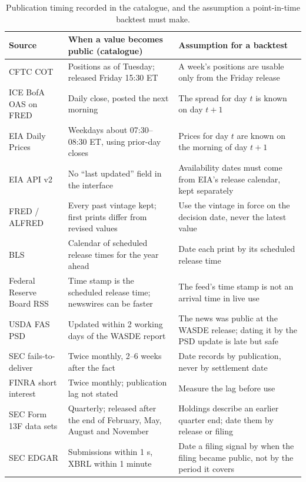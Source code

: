 \documentclass[10pt, a4paper, twocolumn]{article}
\renewcommand{\toprule}{\arrayrulecolor{qnavy}\specialrule{\heavyrulewidth}{\abovetopsep}{\belowrulesep}\arrayrulecolor{black}}
\newcommand{\qstripes}{\rowcolors{2}{qstripe}{white}}
\newcommand{\qhead}[1]{\textbf{\color{qnavy}#1}}
\begin{document}
\begin{table}[!t]
\centering
\caption{Publication timing recorded in the catalogue, and the assumption a point-in-time backtest must make.}
\label{tab:timing}
\footnotesize
\setlength{\tabcolsep}{4pt}
\qstripes
\begin{tabularx}{\textwidth}{@{}L{3.4cm}L{6.4cm}Y@{}}
\toprule
\qhead{Source} & \qhead{When a value becomes public (catalogue)} & \qhead{Assumption for a backtest} \\
\midrule
CFTC COT & Positions as of Tuesday; released Friday 15:30 ET & A week's positions are usable only from the Friday release \\
ICE BofA OAS on FRED & Daily close, posted the next morning & The spread for day $t$ is known on day $t+1$ \\
EIA Daily Prices & Weekdays about 07:30--08:30 ET, using prior-day closes & Prices for day $t$ are known on the morning of day $t+1$ \\
EIA API v2 & No ``last updated'' field in the interface & Availability dates must come from EIA's release calendar, kept separately \\
FRED / ALFRED & Every past vintage kept; first prints differ from revised values & Use the vintage in force on the decision date, never the latest value \\
BLS & Calendar of scheduled release times for the year ahead & Date each print by its scheduled release time \\
Federal Reserve Board RSS & Time stamp is the scheduled release time; newswires can be faster & The feed's time stamp is not an arrival time in live use \\
USDA FAS PSD & Updated within 2 working days of the WASDE report & The news was public at the WASDE release; dating it by the PSD update is late but safe \\
SEC fails-to-deliver & Twice monthly, 2--6 weeks after the fact & Date records by publication, never by settlement date \\
FINRA short interest & Twice monthly; publication lag not stated & Measure the lag before use \\
SEC Form 13F data sets & Quarterly; released after the end of February, May, August and November & Holdings describe an earlier quarter end; date them by release or filing \\
SEC EDGAR & Submissions within 1 s, XBRL within 1 minute & Date a filing signal by when the filing became public, not by the period it covers \\

\end{tabularx}
\end{table}
\end{document}
